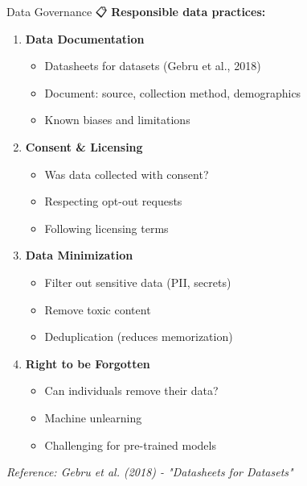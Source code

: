 \documentclass[aspectratio=169]{beamer}
\begin{document}
\begin{frame}[shrink=10]{Data Governance 📋}
\textbf{Responsible data practices:}

\vspace{0.5em}

\begin{enumerate}\setlength{\itemsep}{0pt}
    \item \textbf{Data Documentation}
    \begin{itemize}\setlength{\itemsep}{0pt}
        \item Datasheets for datasets (Gebru et al., 2018)
        \item Document: source, collection method, demographics
        \item Known biases and limitations
    \end{itemize}

    \item \textbf{Consent \& Licensing}
    \begin{itemize}\setlength{\itemsep}{0pt}
        \item Was data collected with consent?
        \item Respecting opt-out requests
        \item Following licensing terms
    \end{itemize}

    \item \textbf{Data Minimization}
    \begin{itemize}\setlength{\itemsep}{0pt}
        \item Filter out sensitive data (PII, secrets)
        \item Remove toxic content
        \item Deduplication (reduces memorization)
    \end{itemize}

    \item \textbf{Right to be Forgotten}
    \begin{itemize}\setlength{\itemsep}{0pt}
        \item Can individuals remove their data?
        \item Machine unlearning
        \item Challenging for pre-trained models
    \end{itemize}
\end{enumerate}

\vspace{0.3em}

\small
\textit{Reference: Gebru et al. (2018) - "Datasheets for Datasets"}
\end{frame}
\end{document}
